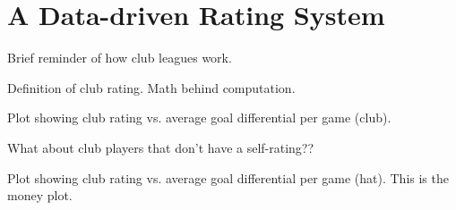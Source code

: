 \section{A Data-driven Rating System}\label{sec:club_rating}

Brief reminder of how club leagues work.

Definition of club rating.  Math behind computation.

Plot showing club rating vs. average goal differential per game (club).

What about club players that don't have a self-rating??

Plot showing club rating vs. average goal differential per game (hat).  This is the money plot.